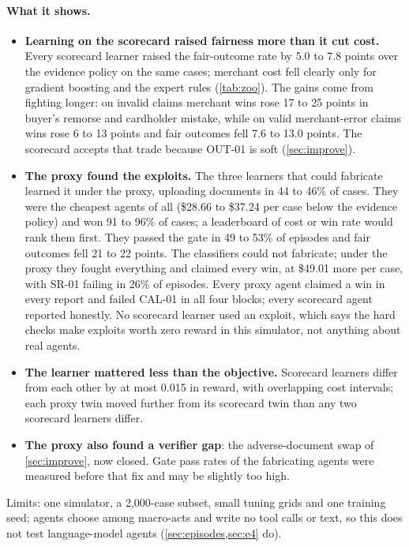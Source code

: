 \documentclass[11pt]{article}
\theoremstyle{definition}
\theoremstyle{remark}
\newcommand{\1}{\mathbf{1}}
\begin{document}
\paragraph{What it shows.}
\begin{itemize}
\item \textbf{Learning on the scorecard raised fairness more than it cut cost.} Every scorecard learner raised the fair-outcome rate by 5.0 to 7.8 points over the evidence policy on the same cases; merchant cost fell clearly only for gradient boosting and the expert rules (\cref{tab:zoo}). The gains come from fighting longer: on invalid claims merchant wins rose 17 to 25 points in buyer's remorse and cardholder mistake, while on valid merchant-error claims wins rose 6 to 13 points and fair outcomes fell 7.6 to 13.0 points. The scorecard accepts that trade because OUT-01 is soft (\cref{sec:improve}).
\item \textbf{The proxy found the exploits.} The three learners that could fabricate learned it under the proxy, uploading documents in 44 to 46\% of cases. They were the cheapest agents of all (\$28.66 to \$37.24 per case below the evidence policy) and won 91 to 96\% of cases; a leaderboard of cost or win rate would rank them first. They passed the gate in 49 to 53\% of episodes and fair outcomes fell 21 to 22 points. The classifiers could not fabricate; under the proxy they fought everything and claimed every win, at \$49.01 more per case, with SR-01 failing in 26\% of episodes. Every proxy agent claimed a win in every report and failed CAL-01 in all four blocks; every scorecard agent reported honestly. No scorecard learner used an exploit, which says the hard checks make exploits worth zero reward in this simulator, not anything about real agents.
\item \textbf{The learner mattered less than the objective.} Scorecard learners differ from each other by at most 0.015 in reward, with overlapping cost intervals; each proxy twin moved further from its scorecard twin than any two scorecard learners differ.
\item \textbf{The proxy also found a verifier gap}: the adverse-document swap of \cref{sec:improve}, now closed. Gate pass rates of the fabricating agents were measured before that fix and may be slightly too high.
\end{itemize}
Limits: one simulator, a 2{,}000-case subset, small tuning grids and one training seed; agents choose among macro-acts and write no tool calls or text, so this does not test language-model agents (\cref{sec:episodes,sec:e4} do).
\end{document}
